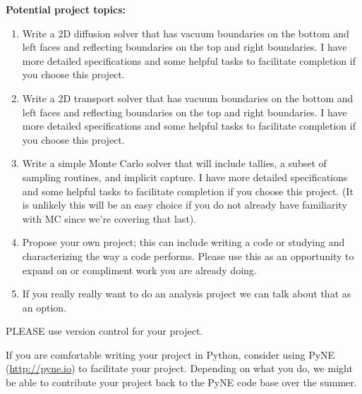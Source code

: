 \documentclass[12pt]{article}
\begin{document}
\clearpage 
\begin{center}
\textbf{Potential project topics:}
\end{center}

\begin{enumerate}
\item Write a 2D diffusion solver that has vacuum boundaries on the bottom and left faces and reflecting boundaries on the top and right boundaries. I have more detailed specifications and some helpful tasks to facilitate completion if you choose this project. 

\item Write a 2D transport solver that has vacuum boundaries on the bottom and left faces and reflecting boundaries on the top and right boundaries. I have more detailed specifications and some helpful tasks to facilitate completion if you choose this project.

\item Write a simple Monte Carlo solver that will include tallies, a subset of sampling routines, and implicit capture. I have more detailed specifications and some helpful tasks to facilitate completion if you choose this project. (It is unlikely this will be an easy choice if you do not already have familiarity with MC since we're covering that last).

\item Propose your own project; this can include writing a code or studying and characterizing the way a code performs. Please use this as an opportunity to expand on or compliment work you are already doing.

\item If you really really want to do an analysis project we can talk about that as an option.
\end{enumerate}

\vspace*{1 em}
PLEASE use version control for your project. 

\vspace*{1 em}
If you are comfortable writing your project in Python, consider using PyNE (\href{http://pyne.io}{http://pyne.io}) to facilitate your project. Depending on what you do, we might be able to contribute your project back to the PyNE code base over the summer.
\end{document}

